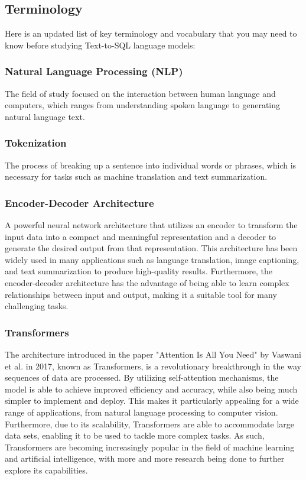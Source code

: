 \subsection{Terminology}

Here is an updated list of key terminology and vocabulary that you may need to know before studying Text-to-SQL language models:

\subsubsection{Natural Language Processing (NLP)} The field of study focused on the interaction between human language and computers, which ranges from understanding spoken language to generating natural language text.
\subsubsection{Tokenization} The process of breaking up a sentence into individual words or phrases, which is necessary for tasks such as machine translation and text summarization.
\subsubsection{Encoder-Decoder Architecture} A powerful neural network architecture that utilizes an encoder\cite{cho-etal-2014-learning} to transform the input data into a compact and meaningful representation and a decoder to generate the desired output from that representation. This architecture has been widely used in many applications such as language translation, image captioning, and text summarization to produce high-quality results. Furthermore, the encoder-decoder architecture has the advantage of being able to learn complex relationships between input and output, making it a suitable tool for many challenging tasks.
\subsubsection{Transformers} The architecture introduced in the paper "Attention Is All You Need" by Vaswani et al. in 2017\cite{https://doi.org/10.48550/arxiv.1706.03762}, known as Transformers, is a revolutionary breakthrough in the way sequences of data are processed. By utilizing self-attention mechanisms, the model is able to achieve improved efficiency and accuracy, while also being much simpler to implement and deploy. This makes it particularly appealing for a wide range of applications, from natural language processing to computer vision. Furthermore, due to its scalability, Transformers are able to accommodate large data sets, enabling it to be used to tackle more complex tasks. As such, Transformers are becoming increasingly popular in the field of machine learning and artificial intelligence, with more and more research being done to further explore its capabilities.

